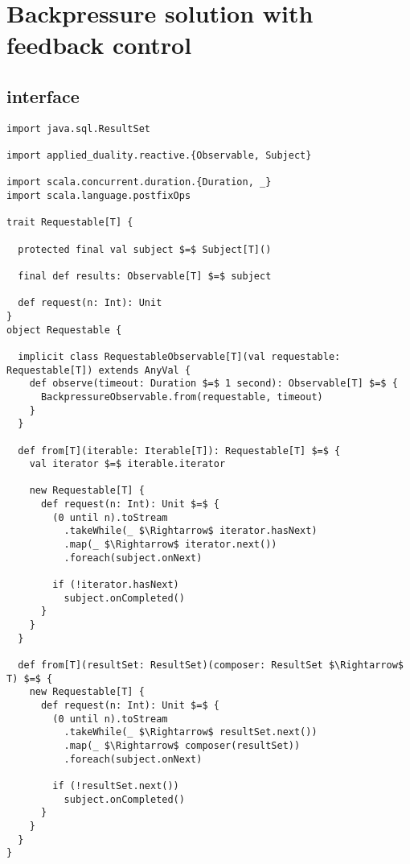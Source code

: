 \chapter{Backpressure solution with feedback control}
\label{app:backpressure-solution}

\section{ interface}
\label{appsec:requestable-interface}
\begin{lstlisting}[style=ScalaStyle, caption={Universal, interactive interface, \code{Requestable}, used in the feedback system}]
import java.sql.ResultSet

import applied_duality.reactive.{Observable, Subject}

import scala.concurrent.duration.{Duration, _}
import scala.language.postfixOps

trait Requestable[T] {

  protected final val subject $=$ Subject[T]()

  final def results: Observable[T] $=$ subject

  def request(n: Int): Unit
}
object Requestable {

  implicit class RequestableObservable[T](val requestable: Requestable[T]) extends AnyVal {
    def observe(timeout: Duration $=$ 1 second): Observable[T] $=$ {
      BackpressureObservable.from(requestable, timeout)
    }
  }

  def from[T](iterable: Iterable[T]): Requestable[T] $=$ {
    val iterator $=$ iterable.iterator

    new Requestable[T] {
      def request(n: Int): Unit $=$ {
        (0 until n).toStream
          .takeWhile(_ $\Rightarrow$ iterator.hasNext)
          .map(_ $\Rightarrow$ iterator.next())
          .foreach(subject.onNext)

        if (!iterator.hasNext)
          subject.onCompleted()
      }
    }
  }

  def from[T](resultSet: ResultSet)(composer: ResultSet $\Rightarrow$ T) $=$ {
    new Requestable[T] {
      def request(n: Int): Unit $=$ {
        (0 until n).toStream
          .takeWhile(_ $\Rightarrow$ resultSet.next())
          .map(_ $\Rightarrow$ composer(resultSet))
          .foreach(subject.onNext)

        if (!resultSet.next())
          subject.onCompleted()
      }
    }
  }
}
\end{lstlisting}
